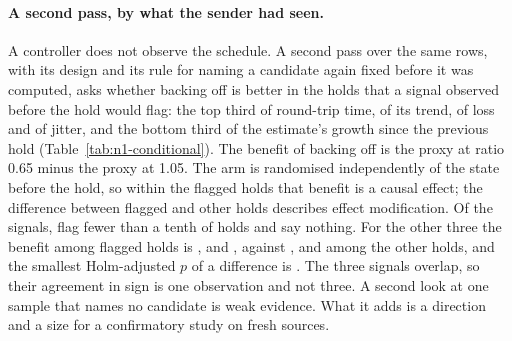 \paragraph{A second pass, by what the sender had seen.}
A controller does not observe the schedule. A second pass over the same rows, with its design and its rule for naming a candidate again fixed before it was computed, asks whether backing off is better in the holds that a signal observed before the hold would flag: the top third of round-trip time, of its trend, of loss and of jitter, and the bottom third of the estimate's growth since the previous hold (Table~\ref{tab:n1-conditional}). The benefit of backing off is the proxy at ratio 0.65 minus the proxy at 1.05. The arm is randomised independently of the state before the hold, so within the flagged holds that benefit is a causal effect; the difference between flagged and other holds describes effect modification. \NOneCondCandidateSentence{} Of the \NOneCondSignals{} signals, \NOneCondUnusable{} flag fewer than a tenth of holds and say nothing. For the other three the benefit among flagged holds is \NOneCondGrowthFlagged{} \NOneCondGrowthFlaggedT{}, \NOneCondJitterFlagged{} \NOneCondJitterFlaggedT{} and \NOneCondRttFlagged{} \NOneCondRttFlaggedT{}, against \NOneCondGrowthRest{}, \NOneCondJitterRest{} and \NOneCondRttRest{} among the other holds, and the smallest Holm-adjusted $p$ of a difference is \NOneCondBestHolm{}. The three signals overlap, so their agreement in sign is one observation and not three. A second look at one sample that names no candidate is weak evidence. What it adds is a direction and a size for a confirmatory study on fresh sources.

\begin{table}[t]
\centering\small
\resizebox{\linewidth}{!}{}
\caption{Exploratory, second pass. Benefit of backing off, defined as the on-time sampled PSNR contribution at ratio 0.65 minus that at ratio 1.05, among holds flagged by a signal observed before the hold and among the other holds, with 95\% intervals over sources and Holm-adjusted $p$ for their difference. Thresholds are pooled tercile cut-offs.}
\label{tab:n1-conditional}
\end{table}
\fi

